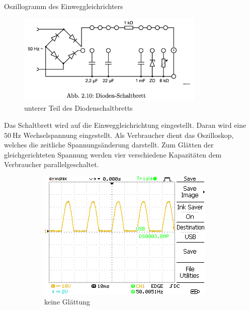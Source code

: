 \documentclass{article}
\theoremstyle{definition}
\begin{document}
\begin{aufgabe}{Oszillogramm des Einweggleichrichters}
    \label{Aufgabe3}
    \aufbau
    \begin{figure}[H]
        \centering
        \includegraphics[width=0.8\textwidth]{figs/Aufbau3.png}
        \caption{unterer Teil des Diodenschaltbretts\cite{anleitung}}
        \label{aufbau3}
    \end{figure}
    Das Schaltbrett wird auf die Einweggleichrichtung eingestellt. Daran wird eine $\SI{50}{\hertz}$ Wechselspannung eingestellt. Als Verbraucher dient das Oszilloskop, welches die zeitliche Spannungsänderung darstellt. Zum Glätten der gleichgerichteten Spannung werden vier verschiedene Kapazitäten dem Verbraucher parallelgeschaltet.
    \messwerte
    \begin{figure}[H]
        \begin{subfigure}[b]{0.49 \textwidth}
            \includegraphics[width=\textwidth]{MesswerteVersuch2/DS0003.png}
            \caption{keine Glättung}
            \label{a3_a}
        \end{subfigure}
        \hfill
        \begin{subfigure}[b]{0.49 \textwidth}

\end{subfigure}
\end{figure}
\end{aufgabe}
\end{document}
